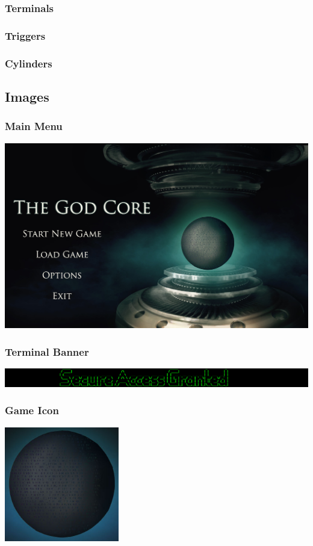 \documentclass{article}
\begin{document}
\subsubsection{Terminals}

\subsubsection{Triggers}

\tiny{}
\subsubsection{Cylinders}

\small{}
\subsection{Images}

\subsubsection{Main Menu}
	\includegraphics[width=18cm]{../Resources/Images/Main}
\subsubsection{Terminal Banner}
	\includegraphics[width=18cm]{../Resources/Images/banner}
\subsubsection{Game Icon}
	\includegraphics[width=5cm]{../Resources/Images/Core}
	
\end{document}
